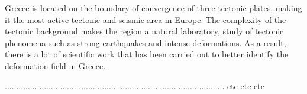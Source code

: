 \begin{extsum}

\graphicspath{{Chapter4/Figs/Vector/}{Chapter4/Figs/}{Chapter5/Figs/Vector/}{Chapter6/Figs/Vector1/}{Chapter7/Figs/Vector/}}

  \let\thefootnote\relax{}
  \let\thefootnote\relax{}
  \let\thefootnote\relax{}


Greece is located on the boundary of convergence of three tectonic plates, making it the most active tectonic and seismic area in Europe. The complexity of the tectonic background makes the region a natural laboratory, study of tectonic phenomena such as strong earthquakes and intense deformations. As a result, there is a lot of scientific work that has been carried out to better identify the deformation field in Greece.

...............................
...............................
...............................
etc etc etc

\end{extsum}
